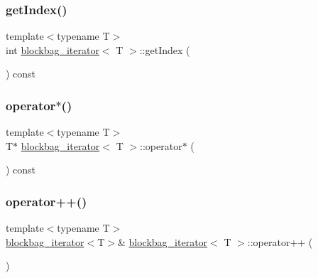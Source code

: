 \mbox{\label{classblockbag__iterator_a6c1d126ebb9bb7c5d32366f18e8ed83d}} 
\subsubsection{\texorpdfstring{get\+Index()}{getIndex()}}
{\footnotesize\ttfamily template$<$typename T$>$ \\
int \hyperlink{classblockbag__iterator}{blockbag\+\_\+iterator}$<$ T $>$\+::get\+Index (\begin{DoxyParamCaption}{ }\end{DoxyParamCaption}) const\hspace{0.3cm}{\ttfamily [inline]}}

\mbox{\label{classblockbag__iterator_a4c44f3c7850d4548e4be02745c82fbed}} 
\subsubsection{\texorpdfstring{operator$\ast$()}{operator*()}}
{\footnotesize\ttfamily template$<$typename T$>$ \\
T$\ast$ \hyperlink{classblockbag__iterator}{blockbag\+\_\+iterator}$<$ T $>$\+::operator$\ast$ (\begin{DoxyParamCaption}{ }\end{DoxyParamCaption}) const\hspace{0.3cm}{\ttfamily [inline]}}

\mbox{\label{classblockbag__iterator_a37c398b44de81928b694f808e6347eab}} 
\subsubsection{\texorpdfstring{operator++()}{operator++()}}
{\footnotesize\ttfamily template$<$typename T$>$ \\
\hyperlink{classblockbag__iterator}{blockbag\+\_\+iterator}$<$T$>$\& \hyperlink{classblockbag__iterator}{blockbag\+\_\+iterator}$<$ T $>$\+::operator++ (\begin{DoxyParamCaption}\item[{int}]{ }\end{DoxyParamCaption})\hspace{0.3cm}{\ttfamily [inline]}}


